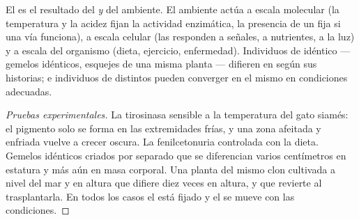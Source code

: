 \begin{proposition}\label{prop:g11:enzymes-and-phenotype:environment}
El  es el resultado del  \emph{y} del ambiente. El
ambiente actúa a escala molecular (la temperatura y la acidez fijan la
actividad enzimática, la presencia de un  fija si una vía
funciona), a escala celular (las  responden a señales, a
nutrientes, a la luz) y a escala del organismo (dieta, ejercicio,
enfermedad). Individuos de  idéntico --- gemelos idénticos,
esquejes de una misma planta --- difieren en  según sus
historias; e individuos de  distintos pueden converger en el
mismo  en condiciones adecuadas.
\end{proposition}
\begin{proof}[Pruebas experimentales]
La tirosinasa sensible a la temperatura del gato siamés: el pigmento
solo se forma en las extremidades frías, y una zona afeitada y enfriada
vuelve a crecer oscura. La fenilcetonuria controlada con la dieta.
Gemelos idénticos criados por separado que se diferencian varios
centímetros en estatura y más aún en masa corporal. Una planta del
mismo clon cultivada a nivel del mar y en altura que difiere diez veces
en altura, y que revierte al trasplantarla. En todos los casos el
 está fijado y el  se mueve con las condiciones.
\end{proof}

